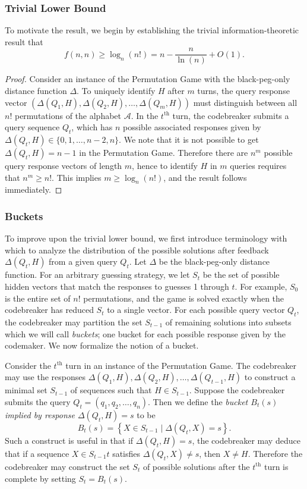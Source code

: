 \documentclass[12pt, a4paper]{article}
\newcommand{\nth}{^{\text{th}}}       %
\begin{document}
	\subsubsection{Trivial Lower Bound}
	To motivate the result, we begin by establishing the trivial information-theoretic result that
	\begin{equation*}
		f(n, n)\ge \log_{n}(n!) = n-\frac{n}{\ln(n)}+O(1).
	\end{equation*}
	\begin{proof}
		Consider an instance of the Permutation Game with the black-peg-only distance function $\Delta$. To uniquely identify $H$ after $m$ turns, the query response vector $(\Delta(Q_1, H), \Delta(Q_2, H), \ldots, \Delta(Q_m, H))$ must distinguish between all $n!$ permutations of the alphabet $\mathcal{A}$. In the $t\nth$ turn, the codebreaker submits a query sequence $Q_t$, which has $n$ possible associated responses given by $\Delta(Q_t, H)\in\{0, 1, \ldots, n-2, n\}$. We note that it is not possible to get $\Delta(Q_t, H)=n-1$ in the Permutation Game. Therefore there are $n^m$ possible query response vectors of length $m$, hence to identify $H$ in $m$ queries requires that $n^m\ge n!$. This implies $m\ge\log_n(n!)$, and the result follows immediately.
	\end{proof}

	\subsubsection{Buckets}
	To improve upon the trivial lower bound, we first introduce terminology with which to analyze the distribution of the possible solutions after feedback $\Delta(Q_t, H)$ from a given query $Q_t$. Let $\Delta$ be the black-peg-only distance function. For an arbitrary guessing strategy, we let $S_t$ be the set of possible hidden vectors that match the responses to guesses 1 through $t$. For example, $S_0$ is the entire set of $n!$ permutations, and the game is solved exactly when the codebreaker has reduced $S_t$ to a single vector. For each possible query vector $Q_t$, the codebreaker may partition the set $S_{t-1}$ of remaining solutions into subsets which we will call \textit{buckets}; one bucket for each possible response given by the codemaker. We now formalize the notion of a bucket.
	
	Consider the $t\nth$ turn in an instance of the Permutation Game. The codebreaker may use the responses $\Delta(Q_1, H), \Delta(Q_2, H), \ldots, \Delta(Q_{t-1}, H)$ to construct a minimal set $S_{t-1}$ of sequences such that $H\in S_{t-1}$. Suppose the codebreaker submits the query $Q_t = (q_1, q_2, \ldots, q_n)$. Then we define the \textit{bucket $B_t(s)$ implied by response $\Delta(Q_t, H)=s$} to be
	\begin{equation*}
		B_t(s) = \left\{X\in S_{t-1}\mid \Delta(Q_t, X) = s\right\}.
	\end{equation*}
	Such a construct is useful in that if $\Delta(Q_t, H) = s$, the codebreaker may deduce that if a sequence $X\in S_{t-1}t$ satisfies $\Delta(Q_t, X)\neq s$, then $X\neq H$. Therefore the codebreaker may construct the set $S_t$ of possible solutions after the $t\nth$ turn is complete by setting $S_t = B_t(s)$.
	
\end{document}
